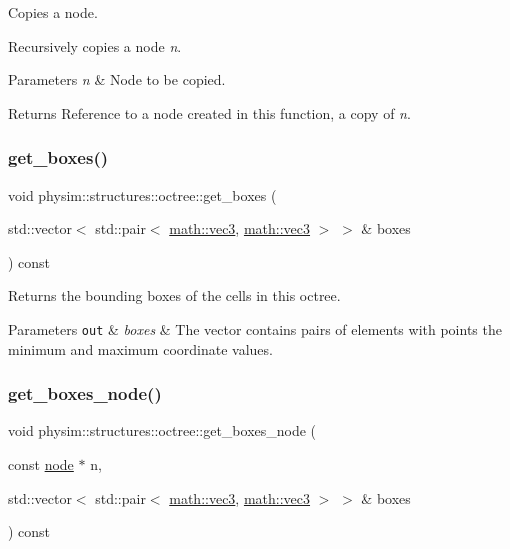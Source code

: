 Copies a node. 

Recursively copies a node {\itshape n}. 
\begin{DoxyParams}{Parameters}
{\em n} & Node to be copied. \\
\hline
\end{DoxyParams}
\begin{DoxyReturn}{Returns}
Reference to a node created in this function, a copy of {\itshape n}. 
\end{DoxyReturn}
\mbox{\label{classphysim_1_1structures_1_1octree_ab113e2fd11a5c146a4c35c6f3e8db63c}} 
\subsubsection{\texorpdfstring{get\+\_\+boxes()}{get\_boxes()}}
{\footnotesize\ttfamily void physim\+::structures\+::octree\+::get\+\_\+boxes (\begin{DoxyParamCaption}\item[{std\+::vector$<$ std\+::pair$<$ \hyperlink{structphysim_1_1math_1_1vec3}{math\+::vec3}, \hyperlink{structphysim_1_1math_1_1vec3}{math\+::vec3} $>$ $>$ \&}]{boxes }\end{DoxyParamCaption}) const}



Returns the bounding boxes of the cells in this octree. 


\begin{DoxyParams}[1]{Parameters}
\mbox{\tt out}  & {\em boxes} & The vector contains pairs of elements with points the minimum and maximum coordinate values. \\
\hline
\end{DoxyParams}
\mbox{\label{classphysim_1_1structures_1_1octree_a4cd66ca4218ba9ff09ba953c4264f8ed}} 
\subsubsection{\texorpdfstring{get\+\_\+boxes\+\_\+node()}{get\_boxes\_node()}}
{\footnotesize\ttfamily void physim\+::structures\+::octree\+::get\+\_\+boxes\+\_\+node (\begin{DoxyParamCaption}\item[{const \hyperlink{structphysim_1_1structures_1_1octree_1_1node}{node} $\ast$}]{n,  }\item[{std\+::vector$<$ std\+::pair$<$ \hyperlink{structphysim_1_1math_1_1vec3}{math\+::vec3}, \hyperlink{structphysim_1_1math_1_1vec3}{math\+::vec3} $>$ $>$ \&}]{boxes }\end{DoxyParamCaption}) const\hspace{0.3cm}{\ttfamily [private]}}



